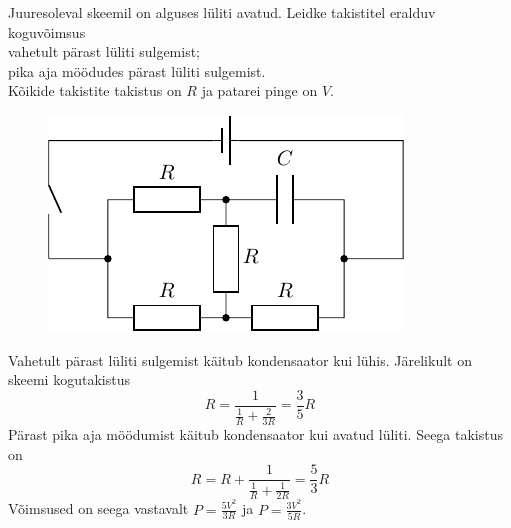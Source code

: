 
Juuresoleval skeemil on alguses lüliti avatud. Leidke takistitel eralduv koguvõimsus \\
\osa vahetult pärast lüliti sulgemist; \\
\osa pika aja möödudes pärast lüliti sulgemist.\\
Kõikide takistite takistus on $R$ ja patarei pinge on $V$.
\vspace{-4pt}
\begin{figure}[h]
  \centering
  \begin{minipage}[h]{0.44\textwidth}
    \includegraphics[width=\textwidth]{2021-v3g-05-yl.pdf}
  \end{minipage}
 \end{figure}
\vspace{-12pt}


\hint

\solu
Vahetult pärast lüliti sulgemist käitub kondensaator kui lühis. Järelikult on skeemi kogutakistus
\[
  R=\frac{1}{\frac 1R + \frac 2{3R}}=\frac 35 R
\]
Pärast pika aja möödumist käitub kondensaator kui avatud lüliti. Seega takistus on
\[
  R=R+\frac{1}{\frac 1R + \frac 1{2R}}=\frac 53 R
\]
Võimsused on seega vastavalt $P=\frac{5V^2}{3R}$ ja $P=\frac{3V^2}{5R}$.
\probend